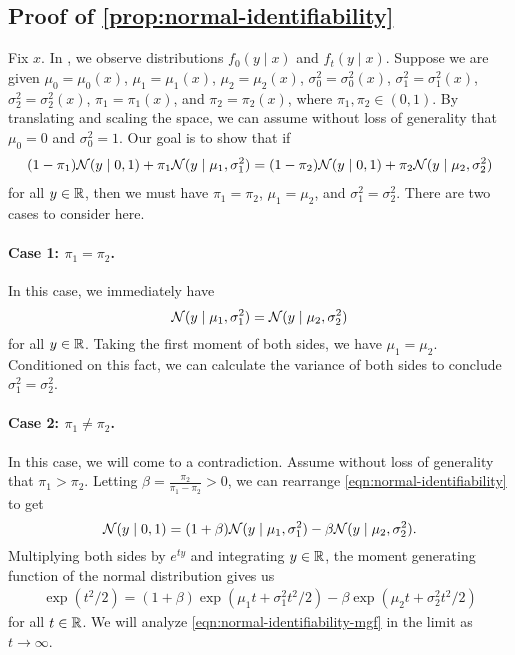 \subsection{Proof of \cref{prop:normal-identifiability}}

Fix $x$. In , we observe distributions $f_0(y \mid x)$ and $f_t(y \mid x)$. Suppose we are given $\mu_0 = \mu_0(x)$, $\mu_1 = \mu_1(x)$, $\mu_2 = \mu_2(x)$, $\sigma_0^2 = \sigma_0^2(x)$, $\sigma_1^2 = \sigma_1^2(x)$, $\sigma_2^2 = \sigma_2^2(x)$,  $\pi_1 = \pi_1(x)$, and $\pi_2 = \pi_2(x)$, where $\pi_1, \pi_2 \in (0,1)$. By translating and scaling the space, we can assume without loss of generality that $\mu_0 = 0$ and $\sigma_0^2 = 1$. Our goal is to show that if
\begin{align}
\label{eqn:normal-identifiability}
(1-\pi_1)\mathcal{N}(y \mid 0, 1) + \pi_1 \mathcal{N}(y \mid \mu_1, \sigma_1^2) = (1-\pi_2)\mathcal{N}(y \mid 0, 1) + \pi_2 \mathcal{N}(y \mid \mu_2, \sigma_2^2) 
\end{align}
for all $y \in \mathbb{R}$, then we must have $\pi_1=\pi_2$, $\mu_1 = \mu_2$, and $\sigma_1^2 = \sigma_2^2$. There are two cases to consider here.

\paragraph{Case 1: $\pi_1 = \pi_2$.} In this case, we immediately have
\[ \mathcal{N}(y \mid \mu_1, \sigma_1^2) = \mathcal{N}(y \mid \mu_2, \sigma_2^2) \]
for all $y \in \mathbb{R}$. Taking the first moment of both sides, we have $\mu_1 = \mu_2$. Conditioned on this fact, we can calculate the variance of both sides to conclude $\sigma_1^2 = \sigma_2^2$. 

\paragraph{Case 2: $\pi_1 \neq \pi_2$.} In this case, we will come to a contradiction. Assume without loss of generality that $\pi_1 > \pi_2$. Letting $\beta = \frac{\pi_2}{\pi_1 - \pi_2} > 0$, we can rearrange \cref{eqn:normal-identifiability} to get
\[ \mathcal{N}(y \mid 0, 1) = (1+\beta) \mathcal{N}(y \mid \mu_1, \sigma_1^2) - \beta \mathcal{N}(y \mid \mu_2, \sigma_2^2).  \]
Multiplying both sides by $e^{ty}$ and integrating $y \in \mathbb{R}$, the moment generating function of the normal distribution gives us
\begin{align}
\label{eqn:normal-identifiability-mgf}
\exp\left( t^2/2 \right)
= (1+\beta)\exp\left( \mu_1 t + \sigma_1^2 t^2/2 \right) - \beta \exp\left( \mu_2 t + \sigma_2^2 t^2/2 \right)   
\end{align}
for all $t \in \mathbb{R}$. We will analyze \cref{eqn:normal-identifiability-mgf} in the limit as $t\rightarrow \infty$.

